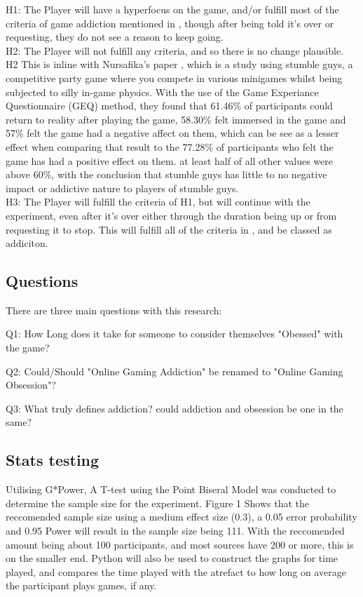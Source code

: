 \documentclass[conference]{IEEEtran}
\begin{document}
H1: The Player will have a hyperfocus on the game, and/or fulfill most of the criteria of game addiction mentioned in \cite{NHSHamp24}, though after being told it's over or requesting, they do not see a reason to keep going.\\

H2: The Player will not fulfill any criteria, and so there is no change plausible.\\

H2 This is inline with Nursafika's paper \cite{Nursafika2024}, which is a study using stumble guys, a competitive party game where you compete in various minigames whilst being subjected to silly in-game physics. With the use of the Game Experiance Questionnaire (GEQ) method, they found that 61.46\% of participants could return to reality after playing the game, 58.30\% felt immersed in the game and 57\% felt the game had a negative affect on them, which can be see as a lesser effect when comparing that result to the 77.28\% of participants who felt the game has had a positive effect on them. at least half of all other values were above 60\%,  with the conclusion that stumble guys has little to no negative impact or addictive nature to players of stumble guys.\\

H3: The Player will fulfill the criteria of H1, but will continue with the experiment, even after it's over either through the duration being up or from requesting it to stop. This will fulfill all of the criteria in \cite{NHSHamp24}, and be classed as addiciton. \\
\subsection{Questions}
There are three main questions with this research:

Q1: How Long does it take for someone to consider themselves "Obessed" with the game?

Q2: Could/Should "Online Gaming Addiction" be renamed to "Online Gaming Obsession"?

Q3: What truly defines addiction? could addiction and obsession be one in the same?\\
\subsection {Stats testing}
Utilising G*Power, A T-test using the Point Biseral Model was conducted to determine the sample size for the experiment. Figure 1 Shows that the reccomended sample size using a medium effect size (0.3), a 0.05 error probability and 0.95 Power will result in the sample size being 111.  With the reccomended amount being about 100 participants, and most sources have 200 or more, this is on the smaller end. Python will also be used to construct the graphs for time played, and compares the time played with the atrefact to how long on average the participant plays games, if any.\\
\end{document}
